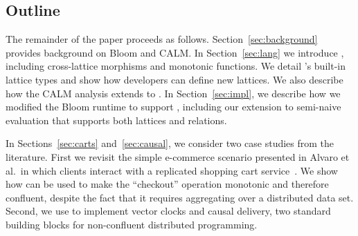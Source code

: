 \subsection{Outline}
The remainder of the paper proceeds as follows.  Section~\ref{sec:background}
provides background on Bloom and CALM.  In Section~\ref{sec:lang} we introduce
\lang, including cross-lattice morphisms and monotonic functions. We detail
\lang's built-in lattice types and show how developers can define new lattices.
We also describe how the CALM analysis extends to \lang.  In
Section~\ref{sec:impl}, we describe how we modified the Bloom runtime to support
\lang, including our extension to semi-naive evaluation that supports both
lattices and relations.

In Sections~\ref{sec:carts} and~\ref{sec:causal}, we consider two case studies
from the literature.  First we revisit the simple e-commerce scenario presented
in Alvaro et al.\ in which clients interact with a replicated shopping cart
service~\cite{Alvaro2011}. We show how \lang can be used to make the
``checkout'' operation monotonic and therefore confluent, despite the fact that
it requires aggregating over a distributed data set.  Second, we use \lang to
implement vector clocks and causal delivery, two standard building blocks for
non-confluent distributed programming.%

